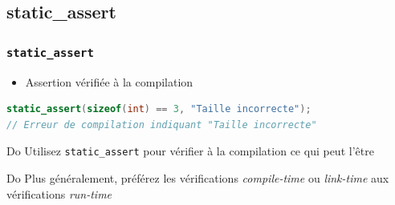 \documentclass[C++.tex]{subfiles}
\begin{document}
\subsection*{static\_assert}
\begin{frame}[fragile]
	\frametitle{\lstinline|static_assert|}
	\begin{itemize}
		\item Assertion vérifiée à la compilation
	\end{itemize}

	\begin{lstlisting}[language=C++]
static_assert(sizeof(int) == 3, "Taille incorrecte");
// Erreur de compilation indiquant "Taille incorrecte"\end{lstlisting}


	\begin{exampleblock}{Do}
		Utilisez \lstinline|static_assert| pour vérifier à la compilation ce qui peut l'être
	\end{exampleblock}

	\begin{exampleblock}{Do}
		Plus généralement, préférez les vérifications \textit{compile-time} ou \textit{link-time} aux vérifications \textit{run-time}

	\end{exampleblock}
\end{frame}
\end{document}
